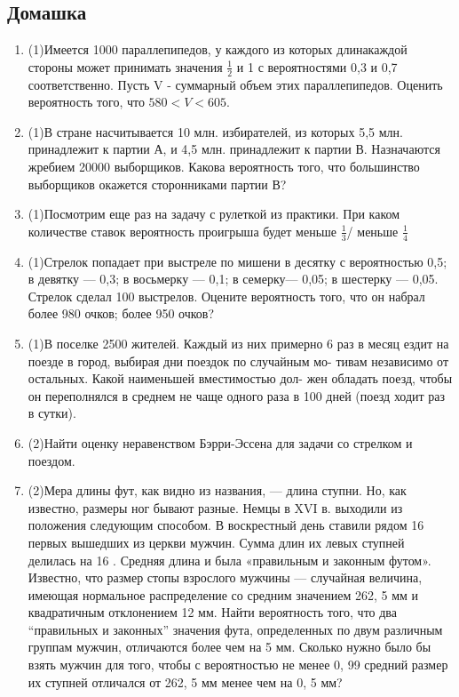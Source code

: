 \documentclass[a4paper, 14pt]{extarticle}
\begin{document}
\subsection*{Домашка}
\begin{enumerate}
\item (1)Имеется 1000 параллепипедов, у каждого из которых длинакаждой стороны может принимать значения
$\frac{1}{2}$ и 1 с вероятностями 0,3 и 0,7 соответственно. Пусть V - суммарный объем этих параллепипедов. 
Оценить вероятность того, что $580< V <605$.
\item (1)В стране насчитывается 10 млн. избирателей, из которых 5,5
млн. принадлежит к партии А, и 4,5 млн. принадлежит к партии В.
Назначаются жребием 20000 выборщиков. Какова вероятность того, что
большинство выборщиков окажется сторонниками партии В?
\item (1)Посмотрим еще раз на задачу с рулеткой из практики. При каком количестве ставок вероятность проигрыша будет меньше $\frac{1}{3}$/ меньше $\frac{1}{4}$
\item (1)Стрелок попадает при выстреле по мишени в десятку с вероятностью 0,5; в девятку —
0,3; в восьмерку — 0,1; в семерку— 0,05; в шестерку — 0,05. Стрелок сделал 100 выстрелов. Оцените
вероятность того, что он набрал более 980 очков; более 950 очков?
\item (1)В поселке 2500 жителей. Каждый из них примерно 6 раз в
месяц ездит на поезде в город, выбирая дни поездок по случайным мо-
тивам независимо от остальных. Какой наименьшей вместимостью дол-
жен обладать поезд, чтобы он переполнялся в среднем не чаще одного
раза в 100 дней (поезд ходит раз в сутки).
\item (2)Найти оценку неравенством Бэрри-Эссена для задачи со стрелком и поездом.
\item (2)Мера длины фут, как видно из названия, — длина ступни. Но, как известно, размеры ног
бывают разные. Немцы в XVI в. выходили из положения следующим способом. В воскрестный день
ставили рядом 16 первых вышедших из церкви мужчин. Сумма длин их левых ступней делилась на
16 . Средняя длина и была «правильным и законным футом». Известно, что размер стопы взрослого
мужчины — случайная величина, имеющая нормальное распределение со средним значением 262, 5
мм и квадратичным отклонением 12 мм. Найти вероятность того, что два “правильных и законных”
значения фута, определенных по двум различным группам мужчин, отличаются более чем на 5 мм.
Сколько нужно было бы взять мужчин для того, чтобы с вероятностью не менее 0, 99 средний размер
их ступней отличался от 262, 5 мм менее чем на 0, 5 мм?

\end{enumerate}
\end{document}

